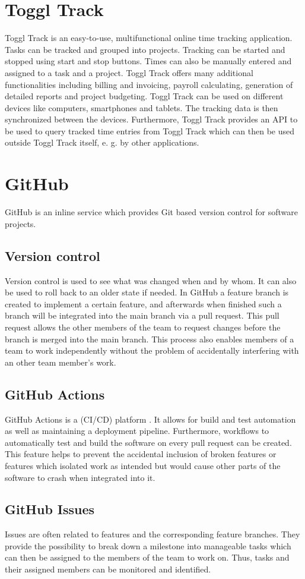 \section{Toggl Track}
Toggl Track is an easy-to-use, multifunctional online time tracking application. Tasks can be tracked and grouped
into projects. Tracking can be started and stopped using start and stop buttons. Times can also be manually entered
and assigned to a task and a project. Toggl Track offers many additional functionalities including billing and invoicing,
payroll calculating, generation of detailed reports and project budgeting. Toggl Track can be used on different devices 
like computers, smartphones and tablets. The tracking data is then synchronized between the devices. Furthermore, Toggl 
Track provides an API to be used to query tracked time entries from Toggl Track which can then be used outside Toggl Track 
itself, e. g. by other applications. \cite{bachelorarbeit_Egger_Verstappen_page8} \cite{toggl_track_url}

\section{GitHub} \label{GitHub}
GitHub \cite{github_url} is an inline service which provides Git based version control for software projects.
\subsection{Version control}
Version control is used to see what was changed when and by whom. It can also be used to roll back to an older state if needed. In GitHub a feature branch is created to implement a certain feature, and afterwards when finished such a branch will be integrated into the main branch via a pull request. This pull request allows the other members of the team to request changes before the branch is merged into the main branch. This process also enables members of a team to work independently without the problem of accidentally interfering with an other team member's work.
\subsection{GitHub Actions}
GitHub Actions is a (CI/CD) platform \cite{github_actions_url}. It allows for build and test automation as well as maintaining a deployment pipeline. Furthermore, workflows to automatically test and build the software on every pull request can be created. This feature helps to prevent the accidental inclusion of broken features or features which isolated work as intended but would cause other parts of the software to crash when integrated into it.
\subsection{GitHub Issues}
Issues are often related to features and the corresponding feature branches. They provide the possibility to break down a milestone into manageable tasks which can then be assigned to the members of the team to work on. Thus, tasks and their assigned members can be monitored and identified. 
